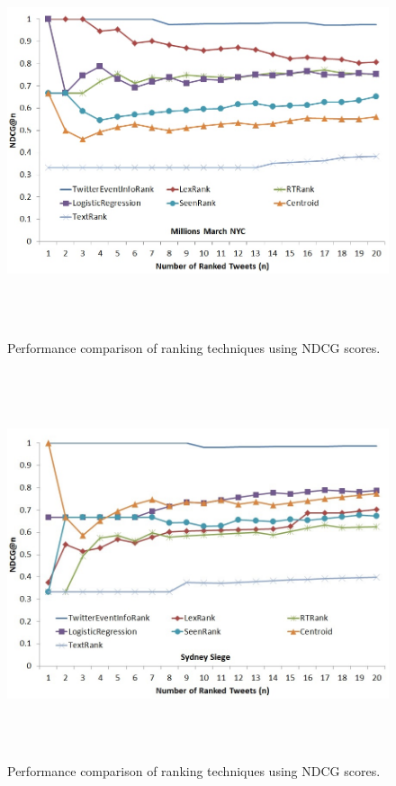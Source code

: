 \begin{figure}[htbp]
\centering
\includegraphics[height=4.5in,width=6in]{Figures/Chapter4Figures/MillionsMarchNycEventIdentityInfoRankPerformance.jpg}
\caption{\small Performance comparison of ranking techniques using NDCG scores.}
\label{millionsmarchndcg}
\end{figure}

\begin{figure}[htbp]
\centering
\includegraphics[height=4.5in,width=6in]{Figures/Chapter4Figures/SydneySiegeEventIdentityInfoRankPerformance.jpg}
\caption{\small Performance comparison of ranking techniques using NDCG scores.}
\label{sydneysiegendcg}
\end{figure}


